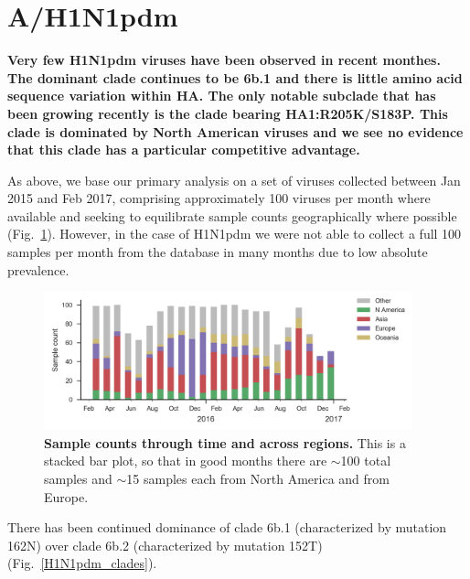 \documentclass[11pt,oneside,letterpaper]{article}
\begin{document}
\clearpage
\pagebreak

\section*{A/H1N1pdm}

\textbf{Very few H1N1pdm viruses have been observed in recent monthes.
The dominant clade continues to be 6b.1 and there is little amino acid sequence variation within HA.
The only notable subclade that has been growing recently is the clade bearing HA1:R205K/S183P.
This clade is dominated by North American viruses and we see no evidence that this clade has a particular competitive advantage.}

As above, we base our primary analysis on a set of viruses collected between Jan 2015 and Feb 2017, comprising approximately 100 viruses per month where available and seeking to equilibrate sample counts geographically where possible (Fig.\ \ref{H1N1pdm_counts}). However, in the case of H1N1pdm we were not able to collect a full 100 samples per month from the database in many months due to low absolute prevalence.

\begin{figure}[H]
	\centering
	\includegraphics[width=0.95\textwidth]{../figures/feb-2017/H1N1pdm_counts.png}
	\caption{\textbf{Sample counts through time and across regions.}
	This is a stacked bar plot, so that in good months there are $\sim$100 total samples and $\sim$15 samples each from North America and from Europe.
	}
	\label{H1N1pdm_counts}
\end{figure}

\pagebreak

There has been continued dominance of clade 6b.1 (characterized by mutation 162N) over clade 6b.2 (characterized by mutation 152T) (Fig.\ \ref{H1N1pdm_clades}).
\end{document}
